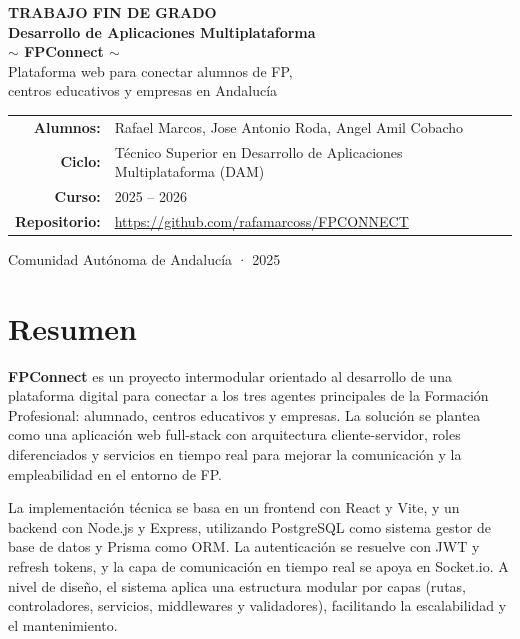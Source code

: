 \documentclass[12pt, a4paper]{report}
\begin{document}
\begin{titlepage}
  \centering
  \vspace*{1.5cm}

  {\Large\bfseries TRABAJO FIN DE GRADO\\[0.4em]
  Desarrollo de Aplicaciones Multiplataforma}\\[2cm]

  {\Huge\bfseries\color{fpgreen} \(\boldsymbol{\sim}\) FPConnect \(\boldsymbol{\sim}\)}\\[0.8cm]

  {\large Plataforma web para conectar alumnos de FP,\\
  centros educativos y empresas en Andalucía}\\[2.5cm]

  \begin{tabular}{rl}
    \textbf{Alumnos:}    & Rafael Marcos, Jose Antonio Roda, Angel Amil Cobacho \\[0.4em]
    \textbf{Ciclo:}      & Técnico Superior en Desarrollo de Aplicaciones Multiplataforma (DAM) \\[0.4em]
    \textbf{Curso:}      & 2025 – 2026 \\[0.4em]
    \textbf{Repositorio:}& \url{https://github.com/rafamarcoss/FPCONNECT} \\
  \end{tabular}

  \vfill
  {\small Comunidad Autónoma de Andalucía · 2025}
\end{titlepage}

\tableofcontents
\clearpage

\chapter{Resumen}

\textbf{FPConnect} es un proyecto intermodular orientado al desarrollo de una plataforma digital para
conectar a los tres agentes principales de la Formación Profesional: alumnado, centros educativos y
empresas. La solución se plantea como una aplicación web full-stack con arquitectura cliente-servidor,
roles diferenciados y servicios en tiempo real para mejorar la comunicación y la empleabilidad en el
entorno de FP.

La implementación técnica se basa en un frontend con React y Vite, y un backend con Node.js y
Express, utilizando PostgreSQL como sistema gestor de base de datos y Prisma como ORM. La
autenticación se resuelve con JWT y refresh tokens, y la capa de comunicación en tiempo real se apoya
en Socket.io. A nivel de diseño, el sistema aplica una estructura modular por capas (rutas,
controladores, servicios, middlewares y validadores), facilitando la escalabilidad y el mantenimiento.
\end{document}
